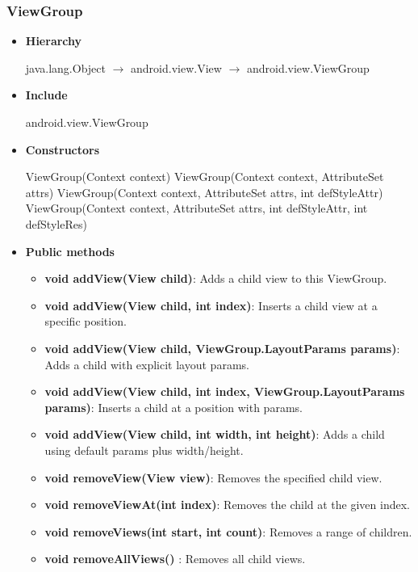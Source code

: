 \documentclass{report}
\begin{document}
    \pagebreak 
    \subsubsection{ViewGroup}
    \begin{itemize}
        \item \textbf{Hierarchy} 
            \begin{center}
                java.lang.Object $\to$	android.view.View $\to$	android.view.ViewGroup 
            \end{center}
        \item \textbf{Include}
            \bigbreak \noindent 
            \begin{javacode}
                android.view.ViewGroup 
            \end{javacode}
        \item \textbf{Constructors}
            \bigbreak \noindent 
            \begin{javacode}
                ViewGroup(Context context)
                ViewGroup(Context context, AttributeSet attrs)
                ViewGroup(Context context, AttributeSet attrs, int defStyleAttr)
                ViewGroup(Context context, AttributeSet attrs, int defStyleAttr, int defStyleRes)
            \end{javacode}
        \item \textbf{Public methods}
            \begin{itemize}
                \item \textbf{void addView(View child)}: Adds a child view to this ViewGroup.
                \item \textbf{void addView(View child, int index)}: Inserts a child view at a specific position.
                \item \textbf{void addView(View child, ViewGroup.LayoutParams params)}: Adds a child with explicit layout params.
                \item \textbf{void addView(View child, int index, ViewGroup.LayoutParams params)}: Inserts a child at a position with params.
                \item \textbf{void addView(View child, int width, int height)}: Adds a child using default params plus width/height.

                \item \textbf{void removeView(View view)}: Removes the specified child view.
                \item \textbf{void removeViewAt(int index)}: Removes the child at the given index.
                \item \textbf{void removeViews(int start, int count)}: Removes a range of children.
                \item \textbf{void removeAllViews()} : Removes all child views.


\end{itemize}
\end{itemize}
\end{document}
